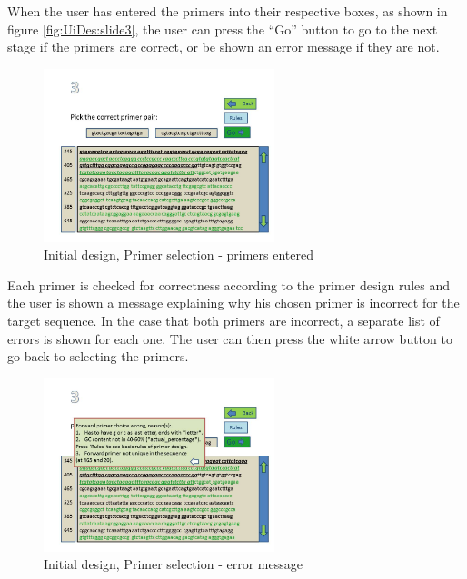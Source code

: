 When the user has entered the primers into their respective boxes, as
shown in figure \ref{fig:UiDes:slide3}, the user can press the ``Go'' button
to go to the next stage if the primers are correct, or be shown an
error message if they are not.

\begin{figure}[h]
  \begin{center}
	\includegraphics[width=0.6\textwidth]{./images/UiDes/Slide4.JPG}
    \caption{
      \label{fig:UiDes:slide4}
      Initial design, Primer selection - primers entered
    }
  \end{center}
\end{figure}

Each primer is checked for correctness according to the primer design
rules and the user is shown a message explaining why his chosen primer
is incorrect for the target sequence.
In the case that both primers are incorrect, a separate list of errors
is shown for each one.
The user can then press the white arrow button to go back to selecting
the primers.

\begin{figure}[h]
  \begin{center}
	\includegraphics[width=0.6\textwidth]{./images/UiDes/slide5.jpg}
    \caption{
      \label{fig:UiDes:slide5}
      Initial design, Primer selection - error message
    }
  \end{center}
\end{figure}


